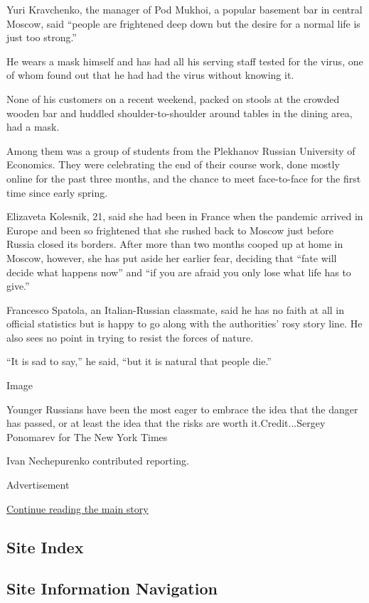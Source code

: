 Yuri Kravchenko, the manager of Pod Mukhoi, a popular basement bar in
central Moscow, said ``people are frightened deep down but the desire
for a normal life is just too strong.''

He wears a mask himself and has had all his serving staff tested for the
virus, one of whom found out that he had had the virus without knowing
it.

None of his customers on a recent weekend, packed on stools at the
crowded wooden bar and huddled shoulder-to-shoulder around tables in the
dining area, had a mask.

Among them was a group of students from the Plekhanov Russian University
of Economics. They were celebrating the end of their course work, done
mostly online for the past three months, and the chance to meet
face-to-face for the first time since early spring.

Elizaveta Kolesnik, 21, said she had been in France when the pandemic
arrived in Europe and been so frightened that she rushed back to Moscow
just before Russia closed its borders. After more than two months cooped
up at home in Moscow, however, she has put aside her earlier fear,
deciding that ``fate will decide what happens now'' and ``if you are
afraid you only lose what life has to give.''

Francesco Spatola, an Italian-Russian classmate, said he has no faith at
all in official statistics but is happy to go along with the
authorities' rosy story line. He also sees no point in trying to resist
the forces of nature.

``It is sad to say,'' he said, ``but it is natural that people die.''

Image

Younger Russians have been the most eager to embrace the idea that the
danger has passed, or at least the idea that the risks are worth
it.Credit...Sergey Ponomarev for The New York Times

Ivan Nechepurenko contributed reporting.

Advertisement

\protect\hyperlink{after-bottom}{Continue reading the main story}

\hypertarget{site-index}{%
\subsection{Site Index}\label{site-index}}

\hypertarget{site-information-navigation}{%
\subsection{Site Information
Navigation}\label{site-information-navigation}}

